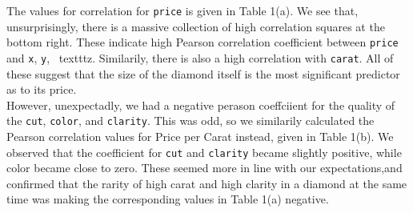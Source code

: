 \documentclass[11pt,letterpaper]{article}
\begin{document}
The values for correlation for \texttt{price} is given in 
Table 1(a). We see that, unsurprisingly, there is a massive collection of high 
correlation squares at the bottom right. These indicate high Pearson 
correlation coefficient between \texttt{price} and \texttt{x}, \texttt{y}, 
\ texttt{z}. Similarily, there is also a high correlation with \texttt{carat}.
All of these suggest that the size of the diamond itself is the most significant 
predictor as to its price. \\

However, unexpectadly, we had a negative perason coeffciient for the quality of 
the \texttt{cut}, \texttt{color}, and \texttt{clarity}. This was odd, so we
similarily calculated the Pearson correlation values for Price per Carat instead, 
given in Table 1(b). We observed that the coefficient for \texttt{cut} and 
\texttt{clarity} became slightly positive, while color became close to zero. 
These seemed more in line with our expectations,and confirmed that the rarity of 
high carat and high clarity in a diamond at the same time was making the 
corresponding values in Table 1(a) negative. 
\end{document}

